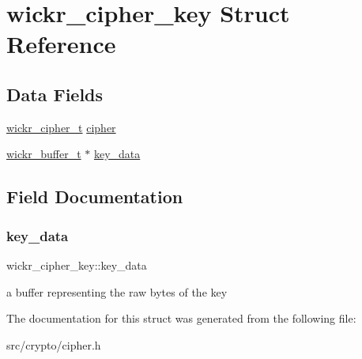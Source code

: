 \hypertarget{structwickr__cipher__key}{}\section{wickr\+\_\+cipher\+\_\+key Struct Reference}
\label{structwickr__cipher__key}
\subsection*{Data Fields}
\begin{DoxyCompactItemize}
\item 
\hyperlink{structwickr__cipher}{wickr\+\_\+cipher\+\_\+t} \hyperlink{group__wickr__cipher_ga6506e1a07f7bc2c5ceeb0ca5ce81385b}{cipher}
\item 
\hyperlink{structwickr__buffer}{wickr\+\_\+buffer\+\_\+t} $\ast$ \hyperlink{structwickr__cipher__key_a0bf9fa22f1db80010410ae609aac8a2a}{key\+\_\+data}
\end{DoxyCompactItemize}


\subsection{Field Documentation}
\mbox{\label{structwickr__cipher__key_a0bf9fa22f1db80010410ae609aac8a2a}} 
\subsubsection{\texorpdfstring{key\+\_\+data}{key\_data}}
{\footnotesize\ttfamily wickr\+\_\+cipher\+\_\+key\+::key\+\_\+data}

a buffer representing the raw bytes of the key 

The documentation for this struct was generated from the following file\+:\begin{DoxyCompactItemize}
\item 
src/crypto/cipher.\+h\end{DoxyCompactItemize}
